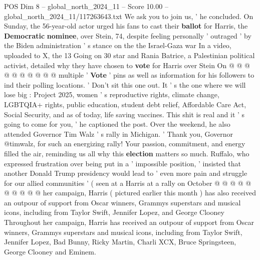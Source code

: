 \begin{textsample}{POS Dim 8 – global\_north\_2024\_11 – Score 10.00 – global\_north\_2024\_11/117263643.txt}
We ask you to join us, ' he concluded.
On Sunday, the 56-year-old actor urged his fans to cast their \textbf{ballot} for Harris, the \textbf{Democratic} \textbf{nominee}, over Stein, 74, despite feeling personally ' outraged ' by the Biden administration ' s stance on the the Israel-Gaza war In a video, uploaded to X, the 13 Going on 30 star and Rania Batrice, a Palestinian political activist, detailed why they have chosen to \textbf{vote} for Harris over Stein On @ @ @ @ @ @ @ @ @ @ multiple ' \textbf{Vote} ' pins as well as information for his followers to ind their polling locations. ' Don't sit this one out.
It ' s the one where we will lose big : Project 2025, women ' s reproductive rights, climate change, LGBTQIA+ rights, public education, student debt relief, Affordable Care Act, Social Security, and as of today, life saving vaccines.
This shit is real and it ' s going to come for you, ' he captioned the post.
Over the weekend, he also attended Governor Tim Walz ' s rally in Michigan. ' Thank you, Governor @timwalz, for such an energizing rally!
Your passion, commitment, and energy filled the air, reminding us all why this \textbf{election} matters so much.
Ruffalo, who expressed frustration over being put in a ' impossible position, ' insisted that another Donald Trump presidency would lead to ' even more pain and struggle for our allied communities ' ( seen at a Harris at a rally on October @ @ @ @ @ @ @ @ @ @ her campaign, Harris ( pictured earlier this month ) has also received an outpour of support from Oscar winners, Grammys superstars and musical icons, including from Taylor Swift, Jennifer Lopez, and George Clooney Throughout her campaign, Harris has received an outpour of support from Oscar winners, Grammys superstars and musical icons, including from Taylor Swift, Jennifer Lopez, Bad Bunny, Ricky Martin, Charli XCX, Bruce Springsteen, George Clooney and Eminem.

\end{textsample}
